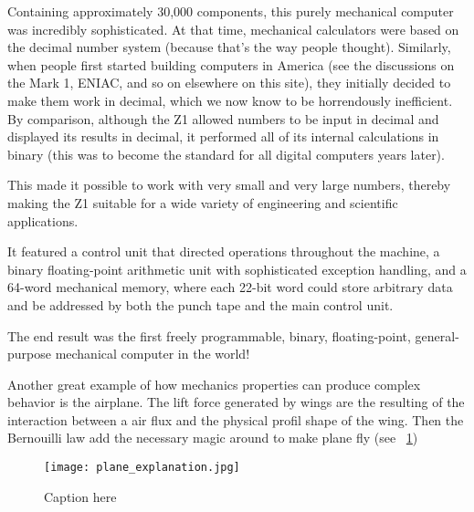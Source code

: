 
Containing approximately 30,000 components, this purely mechanical computer was incredibly sophisticated.
At that time, mechanical calculators were based on the decimal number system (because that’s the way people thought).
Similarly, when people first started building computers in America (see the discussions on the Mark 1, ENIAC, and so on elsewhere on this site), they initially decided to make them work in decimal, which we now know to be horrendously inefficient.
By comparison, although the Z1 allowed numbers to be input in decimal and displayed its results in decimal, it performed all of its internal calculations in binary (this was to become the standard for all digital computers years later).

This made it possible to work with very small and very large numbers, thereby making the Z1 suitable for a wide variety of engineering and scientific applications.

It featured a control unit that directed operations throughout the machine, a binary floating-point arithmetic unit with sophisticated exception handling, and a 64-word mechanical memory, where each 22-bit word could store arbitrary data and be addressed by both the punch tape and the main control unit.

The end result was the first freely programmable, binary, floating-point, general-purpose mechanical computer in the world!



Another great example of how mechanics properties can produce complex behavior is the airplane.
The lift force generated by wings are the resulting of the interaction between a air flux and the physical profil shape of the wing.
Then the Bernouilli law add the necessary magic around to make plane fly (see \figurename~\ref{fig:magic_plane})

\begin{figure}[tb]
    \begin{center}
        \texttt{[image: plane\_explanation.jpg]}
    \end{center}
    \caption{Caption here}
    \label{fig:magic_plane}
\end{figure}

